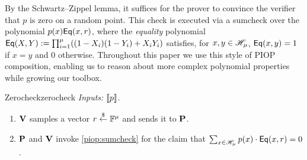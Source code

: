 By the Schwartz--Zippel lemma, it suffices for the prover to convince the verifier that $p$ is zero on a random point. This check is executed via a sumcheck over the polynomial $p(x) \mathsf{Eq}{}(x, r)$, where the \emph{equality} polynomial $\mathsf{Eq}(X, Y) := \prod_{i=1}^{\mu} ((1- X_i)(1- Y_i) + X_i Y_i)$ satisfies, for $x, y \in \mathscr{H}_{\mu}$, $\mathsf{Eq}(x, y) = 1$ if $x = y$ and $0$ otherwise. Throughout this paper we use this style of PIOP composition, enabling us to reason about more complex polynomial properties while growing our toolbox.
\begin{DefinePIOP}{Zerocheck}{zerocheck}
  \emph{Inputs:} $\llbracket p\rrbracket$.
  \begin{enumerate}[nosep]
    \item $\bf{V}$ samples a vector $r \overset{\$}{\leftarrow} \mathbb{F}^\mu$ and sends it to $\bf{P}$.
    \item $\bf{P}$ and $\bf{V}$ invoke \cref{piop:sumcheck} for the claim that $\sum_{x \in \mathscr{H}_{\mu}} p(x) \cdot \mathsf{Eq}{}(x, r) = 0$.
  \end{enumerate}
\end{DefinePIOP}


